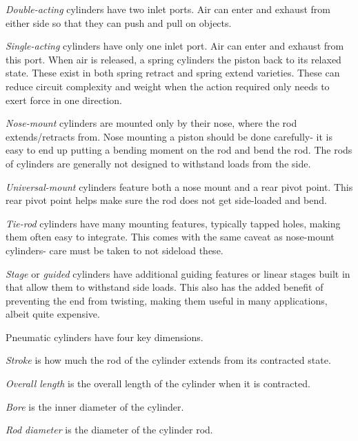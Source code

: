 \begin{asparaenum}[a)]
	\item  \textit{Double-acting} cylinders have two inlet ports. Air can enter and exhaust from either side so that they can push and pull on objects.
	\item \textit{Single-acting} cylinders have only one inlet port. Air can enter and exhaust from this port. When air is released, a spring cylinders the piston back to its relaxed state. These exist in both spring retract and spring extend varieties. These can reduce circuit complexity and weight when the action required only needs to exert force in one direction.
	\item \textit{Nose-mount} cylinders are mounted only by their nose, where the rod extends/retracts from. Nose mounting a piston should be done carefully- it is easy to end up putting a bending moment on the rod and bend the rod. The rods of cylinders are generally not designed to withstand loads from the side.
	\item \textit{Universal-mount} cylinders feature both a nose mount and a rear pivot point. This rear pivot point helps make sure the rod does not get side-loaded and bend.
	\item \textit{Tie-rod} cylinders have many mounting features, typically tapped holes, making them often easy to integrate. This comes with the same caveat as nose-mount cylinders- care must be taken to not sideload these.
	\item \textit{Stage} or \textit{guided} cylinders have additional guiding features or linear stages built in that allow them to withstand side loads. This also has the added benefit of preventing the end from twisting, making them useful in many applications, albeit quite expensive.
\end{asparaenum}

Pneumatic cylinders have four key dimensions.
\begin{asparaenum}[a)]
	\item \textit{Stroke} is how much the rod of the cylinder extends from its contracted state.
	\item \textit{Overall length} is the overall length of the cylinder when it is contracted.
	\item \textit{Bore} is the inner diameter of the cylinder.
	\item \textit{Rod diameter} is the diameter of the cylinder rod.
\end{asparaenum}

